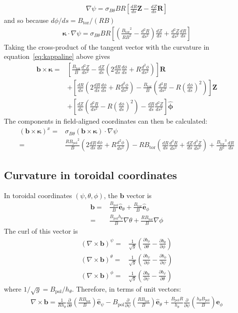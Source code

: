 \documentclass[12pt]{article}
\def\L{\left}
\def\R{\right}
\newcommand{\sbt}{\ensuremath{\sigma_{B\theta}}}
\newcommand{\dd}[2]{\ensuremath{\frac{d #1}{d #2}}}
\newcommand{\ddd}[2]{\ensuremath{\frac{d^2 #1}{d #2^2}}}
\newcommand{\deriv}[2]{\ensuremath{\frac{\partial #1}{\partial #2}}}
\newcommand{\hthe}{\ensuremath{h_\theta}}
\newcommand{\Bp}{\ensuremath{B_{\text{pol}}}}
\newcommand{\Bt}{\ensuremath{B_{\text{tor}}}}
\newcommand{\ve}[1]{\ensuremath{\boldsymbol{#1}}}
\newcommand{\hv}[1]{\hat{\ve{#1}}}
\newcommand{\bvec}{\ve{b}}
\newcommand{\kvec}{\ve{\kappa}}
\newcommand{\phivec}{\ensuremath{\hv{\phi}}}
\newcommand{\ehat}{\ensuremath{\hv{e}}}
\begin{document}
%
\begin{align}
\nabla\psi = \sbt BR\L[\frac{dR}{ds}\ve{Z} - \frac{dZ}{ds}\ve{R}\R]
\label{eq:flinenablapsi}
\end{align}
%
and so because $d\phi / ds = \Bt / \L(RB\R)$
%
\begin{align}
\kvec\cdot\nabla\psi = \sbt BR\L[ \L( \frac{\Bt^2}{RB^2} -
\ddd{R}{s}\R)\dd{Z}{s} + \ddd{Z}{s}\frac{dR}{ds} \R]
\label{eq:flinekappsi}
\end{align}
%
Taking the cross-product of the tangent vector with the curvature in
equation~\ref{eq:kappaline} above gives
%
\begin{align*}
  \bvec \times\kvec =& \L[\frac{\Bt}{B}\ddd{Z}{s} -
\dd{Z}{s}\L(2\dd{R}{s}\dd{\phi}{s} + R\ddd{\phi}{s}\R)\R]\ve{R} \\ &+
    \L[\dd{R}{s}\L(2\dd{R}{s}\dd{\phi}{s} + R\ddd{\phi}{s}\R) -
    \frac{\Bt}{B}\L(\ddd{R}{s} - R\L(\dd{\phi}{s}\R)^2\R)\R]\ve{Z} \\ &+
        \L[\dd{Z}{s}\L(\ddd{R}{s} - R\L(\dd{\phi}{s}\R)^2\R) -
        \dd{R}{s}\ddd{Z}{s}\R]\phivec
\end{align*}
%
The components in field-aligned coordinates can then be calculated:
%
\begin{align*}
\L(\bvec\times\kvec\R)^x =& \sbt\L(\bvec\times\kvec\R)\cdot\nabla\psi \\ =&
    \frac{R\Bp^2}{B}\L(2\dd{R}{s}\dd{\phi}{s} + R\ddd{\phi}{s}\R) -
    R\Bt\L(\dd{R}{s}\ddd{R}{s} + \dd{Z}{s}\ddd{Z}{s}\R) +
    \frac{\Bt^3}{B^2}\dd{R}{s}
\end{align*}
%



\subsection{Curvature in toroidal coordinates}
%
In toroidal coordinates $\L(\psi,\theta,\phi\R)$, the $\bvec$ vector is
%
\begin{align*}
\bvec =& \frac{\Bp}{B}\ehat_\theta + \frac{\Bt}{B}\ehat_\phi \\ =&
    \frac{\Bp\hthe}{B}\nabla\theta + \frac{R\Bt}{B}\nabla\phi
\end{align*}
%
The curl of this vector is
%
\begin{align*}
\L(\nabla\times\bvec\R)^\psi =& \frac{1}{\sqrt{g}}\L(\deriv{b_\phi}{\theta} -
    \deriv{b_\theta}{\phi}\R) \\ \L(\nabla\times\bvec\R)^\theta =&
    \frac{1}{\sqrt{g}}\L(\deriv{b_\psi}{\phi} - \deriv{b_\phi}{\psi}\R) \\
    \L(\nabla\times\bvec\R)^\phi =& \frac{1}{\sqrt{g}}\L(\deriv{b_\theta}{\psi}
    - \deriv{b_\psi}{\theta}\R)
\end{align*}
%
where $1/\sqrt{g} = \Bp/\hthe$. Therefore, in terms of unit vectors:
%
\begin{align*}
\nabla\times\bvec =
\frac{1}{R\hthe}\deriv{}{\theta}\L(\frac{R\Bt}{B}\R)\ehat_\psi -
\Bp\deriv{}{\psi}\L(\frac{R\Bt}{B}\R)\ehat_\theta + \frac{\Bp
R}{\hthe}\deriv{}{\psi}\L(\frac{\hthe\Bp}{B}\R)\ehat_\phi
\end{align*}
%
\end{document}
